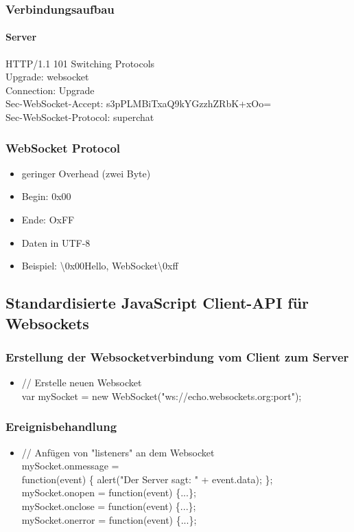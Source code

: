 \documentclass{beamer}
\begin{document}
\begin{frame}
\frametitle{Verbindungsaufbau}
\framesubtitle{Server}
HTTP/1.1 101 Switching Protocols\\
Upgrade: websocket\\
Connection: Upgrade\\
Sec-WebSocket-Accept: s3pPLMBiTxaQ9kYGzzhZRbK+xOo=\\
Sec-WebSocket-Protocol: superchat\\
\end{frame}

\begin{frame}
\frametitle{WebSocket Protocol}
\begin{itemize}
\item geringer Overhead (zwei Byte)
\item Begin: 0x00
\item Ende: OxFF
\item Daten in UTF-8
\item Beispiel: \textbackslash 0x00Hello, WebSocket\textbackslash 0xff
\end{itemize}
\end{frame}

\subsection{Standardisierte JavaScript Client-API für Websockets}
\begin{frame}
\frametitle{Erstellung der Websocketverbindung vom Client zum Server}
\begin{itemize}
\item // Erstelle neuen Websocket \\
var mySocket = new WebSocket("ws://echo.websockets.org:port");
\end{itemize}
\end{frame}

\begin{frame}
\frametitle{Ereignisbehandlung}
\begin{itemize}
\item // Anfügen von "listeners" an dem Websocket \\
	mySocket.onmessage = \\function(event) \{ alert("Der Server sagt: " + event.data); \}; \\
mySocket.onopen = function(event) \{...\}; \\
mySocket.onclose = function(event) \{...\}; \\
mySocket.onerror = function(event) \{...\}; \\
\end{itemize}
\end{frame}
\end{document}

